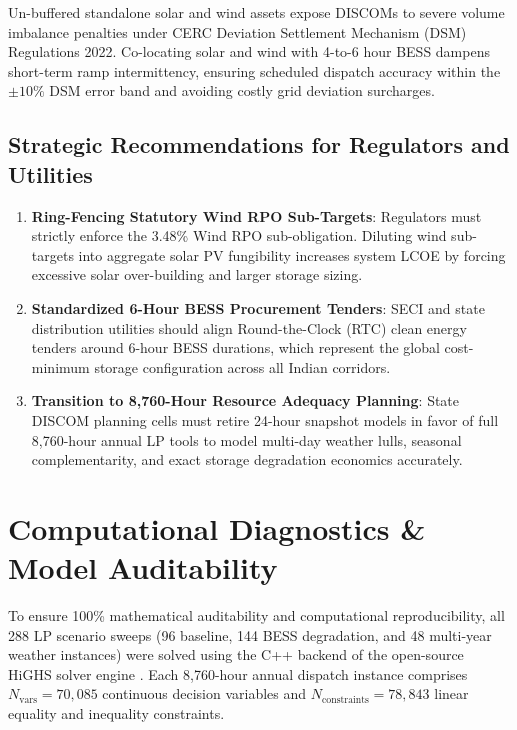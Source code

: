 \documentclass[11pt,a4paper]{article}
\begin{document}
Un-buffered standalone solar and wind assets expose DISCOMs to severe volume imbalance penalties under CERC Deviation Settlement Mechanism (DSM) Regulations 2022. Co-locating solar and wind with 4-to-6 hour BESS dampens short-term ramp intermittency, ensuring scheduled dispatch accuracy within the $\pm 10\%$ DSM error band and avoiding costly grid deviation surcharges.

\subsection{Strategic Recommendations for Regulators and Utilities}
\label{sec:recommendations}

\begin{enumerate}
    \item \textbf{Ring-Fencing Statutory Wind RPO Sub-Targets}: Regulators must strictly enforce the 3.48\% Wind RPO sub-obligation. Diluting wind sub-targets into aggregate solar PV fungibility increases system LCOE by forcing excessive solar over-building and larger storage sizing.
    \item \textbf{Standardized 6-Hour BESS Procurement Tenders}: SECI and state distribution utilities should align Round-the-Clock (RTC) clean energy tenders around 6-hour BESS durations, which represent the global cost-minimum storage configuration across all Indian corridors.
    \item \textbf{Transition to 8,760-Hour Resource Adequacy Planning}: State DISCOM planning cells must retire 24-hour snapshot models in favor of full 8,760-hour annual LP tools to model multi-day weather lulls, seasonal complementarity, and exact storage degradation economics accurately.
\end{enumerate}

\section{Computational Diagnostics \& Model Auditability}
\label{sec:diagnostics}

To ensure 100\% mathematical auditability and computational reproducibility, all 288 LP scenario sweeps (96 baseline, 144 BESS degradation, and 48 multi-year weather instances) were solved using the C++ backend of the open-source HiGHS solver engine \cite{Huangfu2018}. Each 8,760-hour annual dispatch instance comprises $N_{\text{vars}} = 70,085$ continuous decision variables and $N_{\text{constraints}} = 78,843$ linear equality and inequality constraints. 
\end{document}
